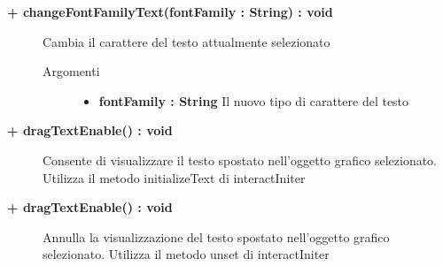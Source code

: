 \begin{description}
	\begin{description}
		\item[\textbf{\color{blue}+ changeFontFamilyText(fontFamily : String) : void	 	}] \hfill
		Cambia il carattere del testo attualmente selezionato
			
		\begin{description}
			\item[Argomenti] \hfill
				\begin{itemize}
				
					\item \textbf{fontFamily : String} \hfill
					Il nuovo tipo di carattere del testo
				\end{itemize}
				
		\end{description}
	\end{description}
	
	\begin{description}
		\item[\textbf{\color{blue}+ dragTextEnable() : void 	}] \hfill 
		Consente di visualizzare il testo spostato nell'oggetto grafico selezionato. Utilizza il metodo initializeText di interactIniter

	\end{description}
	
	\begin{description}
		\item[\textbf{\color{blue}+ dragTextEnable() : void 	}] \hfill 
		Annulla la visualizzazione del testo spostato nell'oggetto grafico selezionato. Utilizza il metodo unset di interactIniter

	\end{description}
	
	
\end{description}